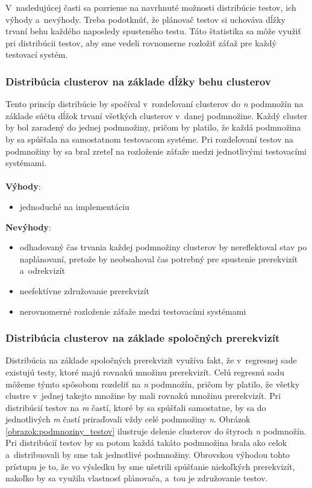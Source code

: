 V~nasledujúcej časti sa pozrieme na navrhnuté možnosti distribúcie 
testov, ich výhody a~nevýhody. Treba podotknúť, že plánovač testov si 
uchováva dĺžky trvaní behu každého naposledy spusteného testu.
Táto štatistika sa môže využiť pri distribúcii testov, aby sme vedeli 
rovnomerne rozložiť záťaž pre každý testovací systém.

\subsubsection*{Distribúcia clusterov na základe dĺžky behu clusterov}
Tento princíp distribúcie by spočíval v~rozdeľovaní clusterov do \textit{n} 
podmnožín na základe súčtu dĺžok trvaní všetkých clusterov v~danej podmnožine. 
Každý cluster by bol zaradený do jednej podmnožiny, pričom by platilo,
že každá podmnožina by sa spúšťala na samostatnom testovacom systéme. 
Pri rozdeľovaní testov na podmnožiny by sa bral zreteľ na rozloženie 
záťaže medzi jednotlivými testovacími systémami.
\\
\\
\noindent \textbf{Výhody}:
\begin{itemize}
\item jednoduché na implementáciu
\end{itemize} 

\noindent \textbf{Nevýhody}:
\begin{itemize}
\item odhadovaný čas trvania každej podmnožiny clusterov by nereflektoval stav 
po naplánovaní, pretože by neobsahoval čas potrebný pre spustenie 
prerekvizít a~odrekvizít
\item neefektívne združovanie prerekvizít
\item nerovnomerné rozloženie záťaže medzi testovacími systémami
\end{itemize}

\subsubsection*{Distribúcia clusterov na základe spoločných prerekvizít}
Distribúcia na základe spoločných prerekvizít využíva fakt, že 
v~regresnej sade existujú testy, ktoré majú rovnakú množinu prerekvizít.
Celú regresnú sadu môžeme týmto spôsobom rozdeliť na \emph{n} podmnožín, 
pričom by platilo, že všetky clustre v~jednej takejto množine by mali
rovnakú množinu prerekvizít. Pri distribúcií testov na \emph{m} častí, 
ktoré by sa spúšťali samostatne, by sa do jednotlivých \emph{m} častí
priraďovali vždy celé podmnožiny \emph{n}. 
Obrázok \ref{obrazok:podmnoziny_testov} ilustruje delenie clusterov do 
štyroch \emph{n} podmnožín. Pri distribúcií testov by sa potom každá 
takáto podmnožina brala ako celok a~distribuovali by sme tak 
jednotlivé podmnožiny.
Obrovskou výhodou tohto prístupu je to, že vo výsledku by sme ušetrili 
spúšťanie niekoľkých prerekvizít, nakoľko by sa využila vlastnosť 
plánovača, a~tou je združovanie testov. 

